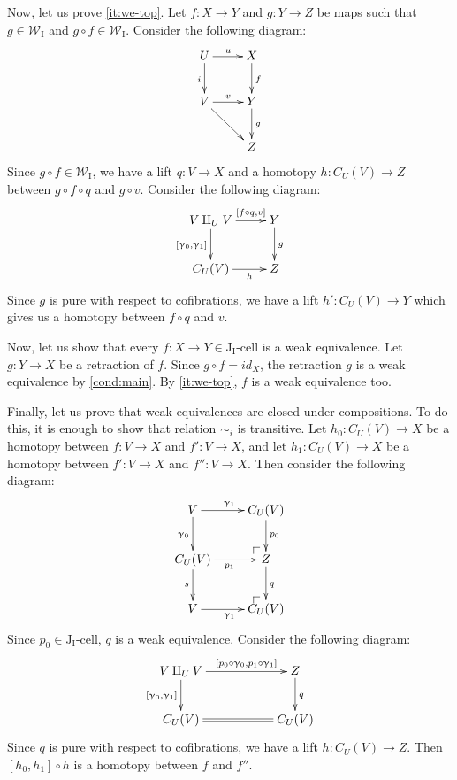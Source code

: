 \documentclass{tac}
\makeatletter
\theoremstyle{definition}
\newcommand{\we}{\mathcal{W}}
\newcommand{\I}{\mathrm{I}}
\newcommand{\J}{\mathrm{J}}
\newcommand{\class}[2]{#1\text{-}\mathrm{#2}}
\newcommand{\Icell}[1][\I]{\class{#1}{cell}}
\newcommand{\Jcell}[1][]{\Icell[\J#1]}
\newcommand{\cyli}{\upgamma}
\newcommand{\po}[1][dr]{\save*!/#1+1.2pc/#1:(1,-1)@^{|-}\restore}
\makeatother
\begin{document}
Now, let us prove \eqref{it:we-top}.
Let $f : X \to Y$ and $g : Y \to Z$ be maps such that $g \in \we_\I$ and $g \circ f \in \we_\I$.
Consider the following diagram:
\[ \xymatrix{ U \ar[r]^u \ar[d]_i & X \ar[d]^f \\
              V \ar[r]^v \ar[rd]  & Y \ar[d]^g \\
                                  & Z
            } \]
Since $g \circ f \in \we_\I$, we have a lift $q : V \to X$ and a homotopy $h : C_U(V) \to Z$ between $g \circ f \circ q$ and $g \circ v$.
Consider the following diagram:
\[ \xymatrix{ V \amalg_U V \ar[r]^-{[f \circ q, v]} \ar[d]_{[\cyli_0,\cyli_1]} & Y \ar[d]^g \\
              C_U(V) \ar[r]_-h & Z
            } \]
Since $g$ is pure with respect to cofibrations, we have a lift $h' : C_U(V) \to Y$ which gives us a homotopy between $f \circ q$ and $v$.

Now, let us show that every $f : X \to Y \in \Jcell[_\I]$ is a weak equivalence.
Let $g : Y \to X$ be a retraction of $f$.
Since $g \circ f = id_X$, the retraction $g$ is a weak equivalence by \eqref{cond:main}.
By \eqref{it:we-top}, $f$ is a weak equivalence too.

Finally, let us prove that weak equivalences are closed under compositions.
To do this, it is enough to show that relation $\sim_i$ is transitive.
Let $h_0 : C_U(V) \to X$ be a homotopy between $f : V \to X$ and $f' : V \to X$, and
let $h_1 : C_U(V) \to X$ be a homotopy between $f' : V \to X$ and $f'' : V \to X$.
Then consider the following diagram:
\[ \xymatrix{ V \ar[r]^{\cyli_1} \ar[d]_{\cyli_0} & C_U(V) \ar[d]^{p_0} \\
              C_U(V) \ar[r]_{p_1} \ar[d]_s & \po Z \ar[d]^q \\
              V \ar[r]_{\cyli_1} & \po C_U(V)
            } \]
Since $p_0 \in \Jcell[_\I]$, $q$ is a weak equivalence.
Consider the following diagram:
\[ \xymatrix{ V \amalg_U V \ar[rr]^-{[p_0 \circ \cyli_0, p_1 \circ \cyli_1]} \ar[d]_{[\cyli_0,\cyli_1]} & & Z \ar[d]^q \\
              C_U(V) \ar@{=}[rr] & & C_U(V)
            } \]
Since $q$ is pure with respect to cofibrations, we have a lift $h : C_U(V) \to Z$.
Then $[h_0,h_1] \circ h$ is a homotopy between $f$ and $f''$.
\endproof
\end{document}

